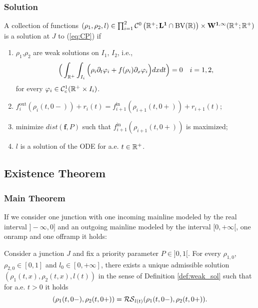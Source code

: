 \begin{frame}[fragile]
\frametitle{Solution}
\begin{definition}
	\label{def:weak_sol}
	A collection of functions $(\rho_1,\rho_2,l)\in \prod_{i=1}^2 {\mathcal C}^0\left( \mathbb R^+; \mathbf{L^1}\cap\hbox{\textrm{BV}} (\mathbb R)\right) \times \mathbf{W^{1,\infty}}(\mathbb R^+;\mathbb R^+)$ is a solution at $J$ to (\ref{eq:CP}) if
	\begin{enumerate}%
		\item \label{item:i} $\rho_1$,$\rho_2$ are weak solutions on $I_1$, $I_2$, i.e.,\begin{equation}	
		\Big(\int_{\mathbb R^+}\int_{I_i}\Big( \rho_i \partial_t\varphi_i +f(\rho_i)\partial_x\varphi_i \Big)dxdt\Big)=0 \quad i=1,2,  		
		\label{eq:weakSolRho}
	\end{equation}
	for every $\varphi_i \in {\mathcal C}^1_c(\mathbb R^+\times I_i)$. 
		\item \label{item:iii} $f^{\text{out}}_{i}(\rho_{i}(t,0-))+r_i(t)=f^{\text{in}}_{i+1}(\rho_{i+1}(t,0+))+r_{i+1}(t)$; 
		\item \label{item:iv} minimize $dist\left(\mathbf{f}, P \right)$ such that $f^{\text{in}}_{i+1}(\rho_{i+1}(t,0+))$ is maximized; %
		\item \label{item:v} $l$ is a solution of the ODE  for a.e. $t\in\mathbb R^+$.		
	\end{enumerate}
\end{definition}

\end{frame}

\subsection{Existence Theorem}
\begin{frame}[fragile]
\frametitle{Main Theorem}
If we consider one junction with one incoming mainline modeled by the real interval $]-\infty,0]$ and an outgoing mainline modeled by the interval $[0,+\infty[$, one onramp and one offramp it holds: 
\vspace*{5mm}
\begin{theorem}
	\label{th:existenceSol}
	Consider a junction $J$ and fix a priority parameter $P \in  ]0,1[$. For every $\rho_{1,0}$,$\rho_{2,0} \in [0,1]$ and $l_0 \in [0, +\infty]$, there exists a unique admissible solution $(\rho_1(t,x),\rho_2(t,x),l(t))$ in the sense of Definition \ref{def:weak_sol} such that for a.e. $t>0$ it holds
$$(\rho_1(t,0-),\rho_2(t,0+))=\mathcal{RS}_{l(t)}(\rho_1(t,0-),\rho_2(t,0+)).$$ 
\end{theorem}
\end{frame}

